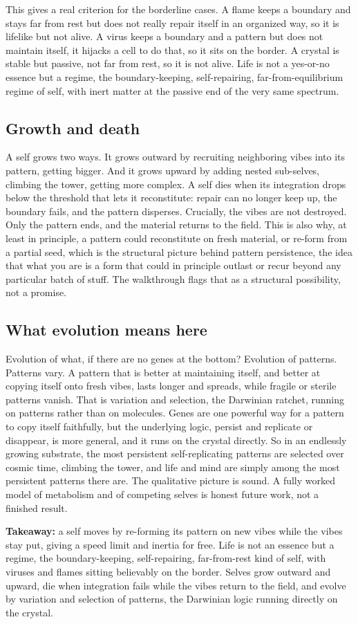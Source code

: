 This gives a real criterion for the borderline cases. A flame keeps a boundary and stays far from rest but does not really repair itself in an organized way, so it is lifelike but not alive. A virus keeps a boundary and a pattern but does not maintain itself, it hijacks a cell to do that, so it sits on the border. A crystal is stable but passive, not far from rest, so it is not alive. Life is not a yes-or-no essence but a regime, the boundary-keeping, self-repairing, far-from-equilibrium regime of self, with inert matter at the passive end of the very same spectrum.

\subsection{Growth and death}

A self grows two ways. It grows outward by recruiting neighboring vibes into its pattern, getting bigger. And it grows upward by adding nested sub-selves, climbing the tower, getting more complex. A self dies when its integration drops below the threshold that lets it reconstitute: repair can no longer keep up, the boundary fails, and the pattern disperses. Crucially, the vibes are not destroyed. Only the pattern ends, and the material returns to the field. This is also why, at least in principle, a pattern could reconstitute on fresh material, or re-form from a partial seed, which is the structural picture behind pattern persistence, the idea that what you are is a form that could in principle outlast or recur beyond any particular batch of stuff. The walkthrough flags that as a structural possibility, not a promise.

\subsection{What evolution means here}

Evolution of what, if there are no genes at the bottom? Evolution of patterns. Patterns vary. A pattern that is better at maintaining itself, and better at copying itself onto fresh vibes, lasts longer and spreads, while fragile or sterile patterns vanish. That is variation and selection, the Darwinian ratchet, running on patterns rather than on molecules. Genes are one powerful way for a pattern to copy itself faithfully, but the underlying logic, persist and replicate or disappear, is more general, and it runs on the crystal directly. So in an endlessly growing substrate, the most persistent self-replicating patterns are selected over cosmic time, climbing the tower, and life and mind are simply among the most persistent patterns there are. The qualitative picture is sound. A fully worked model of metabolism and of competing selves is honest future work, not a finished result.

\textbf{Takeaway:} a self moves by re-forming its pattern on new vibes while the vibes stay put, giving a speed limit and inertia for free. Life is not an essence but a regime, the boundary-keeping, self-repairing, far-from-rest kind of self, with viruses and flames sitting believably on the border. Selves grow outward and upward, die when integration fails while the vibes return to the field, and evolve by variation and selection of patterns, the Darwinian logic running directly on the crystal.
